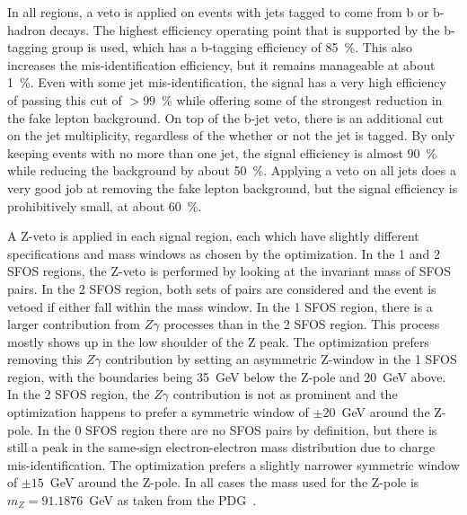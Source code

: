 In all regions, 
a veto is applied on events with jets tagged to come from b or b-hadron decays. The highest
efficiency operating point that is supported by the b-tagging group is used,
which has a b-tagging efficiency of 85~\%.  This also increases the mis-identification efficiency, 
but it remains manageable at about 1~\%. Even with some jet mis-identification, the signal has
a very high efficiency of passing this cut of $> 99$~\% while offering some of the strongest 
reduction in the fake lepton background. On top of the b-jet veto, there is an additional
cut on the jet multiplicity, regardless of the whether or not the jet is tagged. By only keeping
events with no more than one jet, the signal efficiency is almost $90$~\% while reducing
the background by about 50~\%.  Applying a veto on all jets does a very good job at removing the fake lepton
background, but the signal efficiency is prohibitively small, at about 60~\%. 

A Z-veto is applied in each signal region, 
each which have slightly different specifications and mass windows
as chosen by the optimization. In the 1 and 2 SFOS regions, the Z-veto is performed
by looking at the invariant mass of SFOS pairs. In the 2 SFOS region, both sets of pairs
are considered and the event is vetoed if either fall within the mass window.  In the 
1 SFOS region, there is a larger contribution from $Z\gamma$ processes than in the 2 SFOS
region.  This process mostly shows up in the low shoulder of the Z peak. The optimization
prefers removing this $Z\gamma$ contribution by setting an asymmetric Z-window in the 1 SFOS
region, with the boundaries being 35~GeV below the Z-pole and 20~GeV above. In the 2 SFOS region,
the $Z\gamma$ contribution is not as prominent and the optimization happens to prefer a symmetric
window of $\pm20$~GeV around the Z-pole.  In the 0 SFOS region there are no SFOS pairs by definition,
but there is still a peak in the same-sign electron-electron mass distribution due to charge mis-identification.
The optimization prefers a slightly narrower symmetric window of $\pm15$~GeV around the Z-pole. In all cases
the mass used for the Z-pole is $m_{Z}=91.1876$~GeV as taken from the PDG~\cite{PDG:2014}. 

